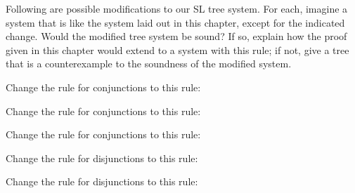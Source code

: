 \solutions
\problempart
\label{pr.SL.soundness-resolutions}
Following are possible modifications to our SL tree system. For each, imagine a system that is like the system laid out in this chapter, except for the indicated change. Would the modified tree system be sound? If so, explain how the proof given in this chapter would extend to a system with this rule; if not, give a tree that is a counterexample to the soundness of the modified system.
\begin{earg}
\item Change the rule for conjunctions to this rule:

\item Change the rule for conjunctions to this rule:

\item Change the rule for conjunctions to this rule:

\item Change the rule for disjunctions to this rule:

\item Change the rule for disjunctions to this rule:


\end{earg}
